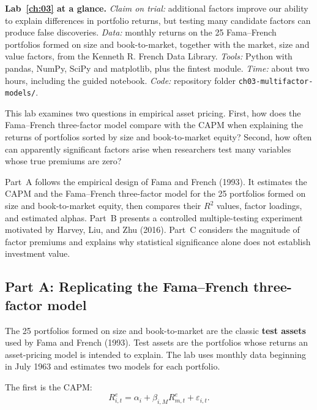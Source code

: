 \begin{callout}
\textbf{Lab~\ref{ch:03} at a glance.} \emph{Claim on trial:} additional factors improve our ability to explain differences in portfolio returns, but testing many candidate factors can produce false discoveries. \emph{Data:} monthly returns on the 25 Fama--French portfolios formed on size and book-to-market, together with the market, size and value factors, from the Kenneth R. French Data Library. \emph{Tools:} Python with pandas, NumPy, SciPy and matplotlib, plus the fintest module. \emph{Time:} about two hours, including the guided notebook. \emph{Code:} repository folder \texttt{ch03-multifactor-models/}.
\end{callout}

This lab examines two questions in empirical asset pricing. First, how does the Fama--French three-factor model compare with the CAPM when explaining the returns of portfolios sorted by size and book-to-market equity? Second, how often can apparently significant factors arise when researchers test many variables whose true premiums are zero?

Part~A follows the empirical design of Fama and French (1993). It estimates the CAPM and the Fama--French three-factor model for the 25 portfolios formed on size and book-to-market equity, then compares their $R^2$ values, factor loadings, and estimated alphas. Part~B presents a controlled multiple-testing experiment motivated by Harvey, Liu, and Zhu (2016). Part~C considers the magnitude of factor premiums and explains why statistical significance alone does not establish investment value.

\subsection*{Part A: Replicating the Fama--French three-factor model}

The 25 portfolios formed on size and book-to-market are the classic \textbf{test assets} used by Fama and French (1993). Test assets are the portfolios whose returns an asset-pricing model is intended to explain. The lab uses monthly data beginning in July 1963 and estimates two models for each portfolio.

The first is the CAPM:
\begin{equation}
  R^{e}_{i,t}
  = \alpha_i+\beta_{i,M}R^{e}_{m,t}+\varepsilon_{i,t}.
  \label{eq:03-lab-capm}
\end{equation}

